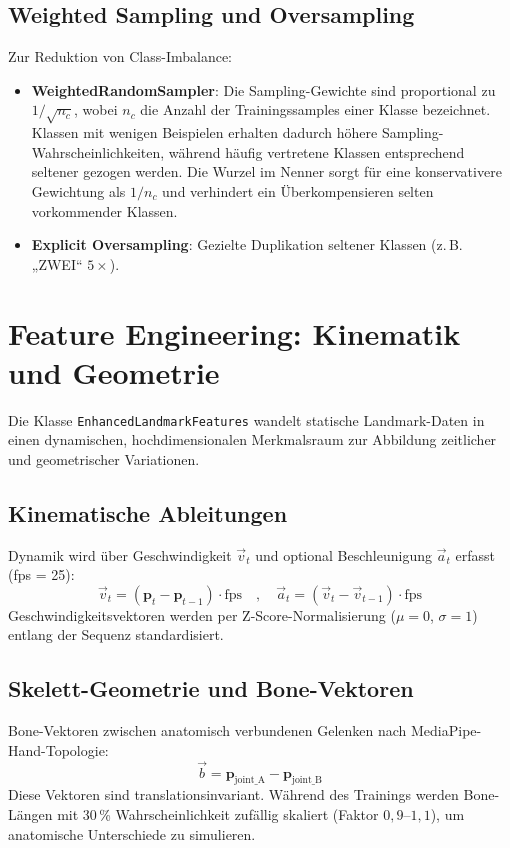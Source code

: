 \subsection{Weighted Sampling und Oversampling}
Zur Reduktion von Class-Imbalance:
\begin{itemize}
    \item \textbf{WeightedRandomSampler}: Die Sampling-Gewichte sind proportional zu $1/\sqrt{n_c}$, wobei $n_c$ die Anzahl der Trainingssamples einer Klasse bezeichnet. Klassen mit wenigen Beispielen erhalten dadurch höhere Sampling-Wahrscheinlichkeiten, während häufig vertretene Klassen entsprechend seltener gezogen werden. Die Wurzel im Nenner sorgt für eine konservativere Gewichtung als $1/n_c$ und verhindert ein Überkompensieren selten vorkommender Klassen.
    \item \textbf{Explicit Oversampling}: Gezielte Duplikation seltener Klassen (z.\,B. „ZWEI“ $5\times$).
\end{itemize}

\section{Feature Engineering: Kinematik und Geometrie}
Die Klasse \texttt{EnhancedLandmarkFeatures} wandelt statische Landmark-Daten in einen dynamischen, hochdimensionalen Merkmalsraum zur Abbildung zeitlicher und geometrischer Variationen.

\subsection{Kinematische Ableitungen}
Dynamik wird über Geschwindigkeit $\vec{v}_t$ und optional Beschleunigung $\vec{a}_t$ erfasst (fps = 25):
\begin{equation}
    \vec{v}_t = (\mathbf{p}_t - \mathbf{p}_{t-1}) \cdot \text{fps} \quad , \quad \vec{a}_t = (\vec{v}_t - \vec{v}_{t-1}) \cdot \text{fps}
\end{equation}
Geschwindigkeitsvektoren werden per Z-Score-Normalisierung ($\mu=0$, $\sigma=1$) entlang der Sequenz standardisiert.

\subsection{Skelett-Geometrie und Bone-Vektoren}
Bone-Vektoren zwischen anatomisch verbundenen Gelenken nach MediaPipe-Hand-Topologie:
\begin{equation}
    \vec{b} = \mathbf{p}_{\text{joint\_A}} - \mathbf{p}_{\text{joint\_B}}
\end{equation}
Diese Vektoren sind translationsinvariant. Während des Trainings werden Bone-Längen mit 30\,\% Wahrscheinlichkeit zufällig skaliert (Faktor $0{,}9$–$1{,}1$), um anatomische Unterschiede zu simulieren.

